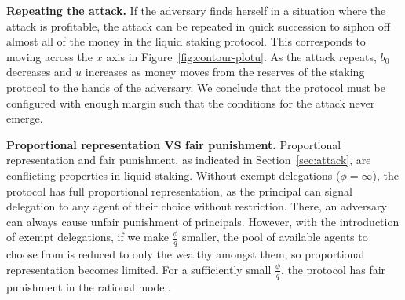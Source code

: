 \noindent
\textbf{Repeating the attack.} If the adversary finds herself in a situation
where the attack is profitable, the attack can be repeated in quick succession
to siphon off almost all of the money in the liquid staking protocol.
This corresponds to moving across the $x$ axis in Figure~\ref{fig:contour-plotu}.
As the attack repeats, $b_0$ decreases and $u$ increases as money moves from
the reserves of the staking protocol to the hands of the adversary.
We conclude that the protocol must be configured with enough margin
such that the conditions for the attack never emerge.





\noindent
\textbf{Proportional representation VS fair punishment.}
Proportional representation and fair punishment, as indicated in
Section~\ref{sec:attack}, are conflicting properties in liquid
staking. Without exempt delegations ($\phi = \infty$),
the protocol has full proportional representation, as the principal can
signal delegation to any agent of their choice without restriction. There,
an adversary can always cause unfair punishment of principals.
However, with the introduction of exempt delegations, if we make
$\frac{\phi}{q}$ smaller, the pool of available agents to choose from is reduced to
only the wealthy amongst them, so proportional representation
becomes limited. For a sufficiently small $\frac{\phi}{q}$,
the protocol has fair punishment in the rational model.

